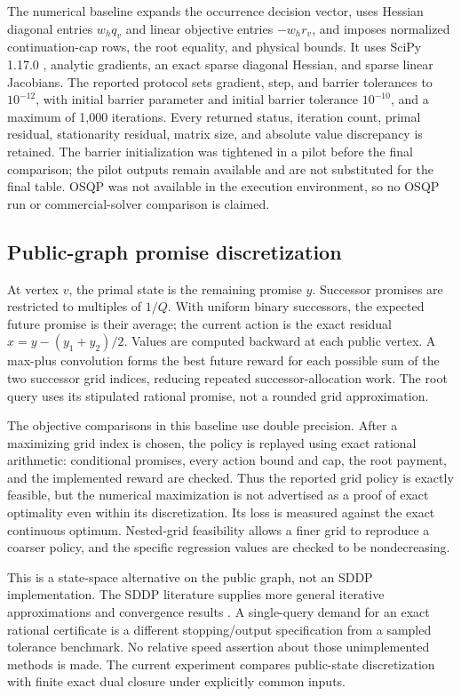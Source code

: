 The numerical baseline expands the occurrence decision vector, uses Hessian diagonal entries $w_hq_v$ and linear objective entries $-w_hr_v$, and imposes normalized continuation-cap rows, the root equality, and physical bounds. It uses SciPy 1.17.0 \citep{Virtanen2020}, analytic gradients, an exact sparse diagonal Hessian, and sparse linear Jacobians. The reported protocol sets gradient, step, and barrier tolerances to $10^{-12}$, with initial barrier parameter and initial barrier tolerance $10^{-10}$, and a maximum of 1,000 iterations. Every returned status, iteration count, primal residual, stationarity residual, matrix size, and absolute value discrepancy is retained. The barrier initialization was tightened in a pilot before the final comparison; the pilot outputs remain available and are not substituted for the final table. OSQP was not available in the execution environment, so no OSQP run or commercial-solver comparison is claimed.

\subsection{Public-graph promise discretization}
At vertex $v$, the primal state is the remaining promise $y$. Successor promises are restricted to multiples of $1/Q$. With uniform binary successors, the expected future promise is their average; the current action is the exact residual $x=y-(y_1+y_2)/2$. Values are computed backward at each public vertex. A max-plus convolution forms the best future reward for each possible sum of the two successor grid indices, reducing repeated successor-allocation work. The root query uses its stipulated rational promise, not a rounded grid approximation.

The objective comparisons in this baseline use double precision. After a maximizing grid index is chosen, the policy is replayed using exact rational arithmetic: conditional promises, every action bound and cap, the root payment, and the implemented reward are checked. Thus the reported grid policy is exactly feasible, but the numerical maximization is not advertised as a proof of exact optimality even within its discretization. Its loss is measured against the exact continuous optimum. Nested-grid feasibility allows a finer grid to reproduce a coarser policy, and the specific regression values are checked to be nondecreasing.

This is a state-space alternative on the public graph, not an SDDP implementation. The SDDP literature supplies more general iterative approximations and convergence results \citep{PereiraPinto1991,Girardeau2015,Dowson2020}. A single-query demand for an exact rational certificate is a different stopping/output specification from a sampled tolerance benchmark. No relative speed assertion about those unimplemented methods is made. The current experiment compares public-state discretization with finite exact dual closure under explicitly common inputs.

